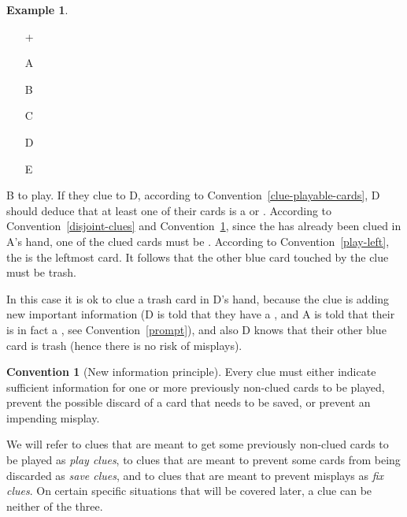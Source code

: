 \documentclass[a4paper]{article}
\theoremstyle{plain}
\theoremstyle{definition}
\newtheorem{example}[theorem]{Example}
\newtheorem{convention}[theorem]{Convention}
\begin{document}
\begin{example} \hfill \\
	\begin{minipage}{0.45\textwidth}
		\begin{itemize}
			\item[\Large +]      
			\item[\Large A]    
			\item[\Large B]    
			\item[\Large C]    
			\item[\Large D]    
			\item[\Large E]    
		\end{itemize}
	\end{minipage}%
	\begin{minipage}{0.55\textwidth}
		B to play. If they clue  to D, according to Convention~\ref{clue-playable-cards}, D should deduce that at least one of their cards is a  or . According to Convention~\ref{disjoint-clues} and Convention~\ref{new-information}, since the  has already been clued in A's hand, one of the clued cards must be . According to Convention~\ref{play-left}, the  is the leftmost card. It follows that the other blue card touched by the clue must be trash. \vspace{0.15 cm}
	
		In this case it is ok to clue a trash card in D's hand, because the clue is adding new important information (D is told that they have a , and A is told that their  is in fact a , see Convention~\ref{prompt}), and also D knows that their other blue card is trash (hence there is no risk of misplays).
	\end{minipage}
\end{example} \vspace{0.15 cm}

\begin{convention}[New information principle]
	\label{new-information}
	Every clue must either indicate sufficient information for one or more previously non-clued cards to be played, prevent the possible discard of a card that needs to be saved, or prevent an impending misplay.
\end{convention}

We will refer to clues that are meant to get some previously non-clued cards to be played as \emph{play clues}, to clues that are meant to prevent some cards from being discarded as \emph{save clues}, and to clues that are meant to prevent misplays as \emph{fix clues}. On certain specific situations that will be covered later, a clue can be neither of the three.
\end{document}

